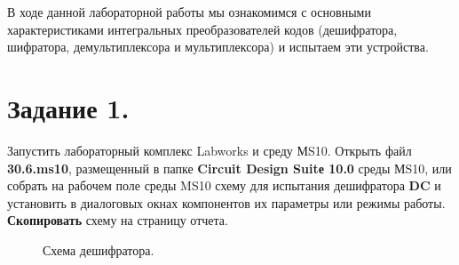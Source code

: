 \documentclass[spec, och, otchet, hidelinks]{SCWorks}
\begin{document}


\tableofcontents






\intro

\par В ходе данной лабораторной работы мы ознакомимся с основными 
характеристиками интегральных преобразователей кодов (дешифратора, шифратора, 
демультиплексора и мультиплексора) и испытаем эти устройства.

\newpage

\section*{Задание 1.}

\par Запустить лабораторный комплекс Labworks и среду МS10. Открыть файл 
\textbf{30.6.ms10}, размещенный в папке \textbf{Circuit Design Suitе 10.0} 
среды МS10, или собрать на рабочем поле среды MS10 схему для испытания дешифратора 
\textbf{DC} и установить в диалоговых окнах компонентов их параметры или режимы 
работы. \textbf{Скопировать} схему на страницу отчета.

\begin{figure}[h]
	\caption{Схема дешифратора.}
\end{figure}
\end{document}
